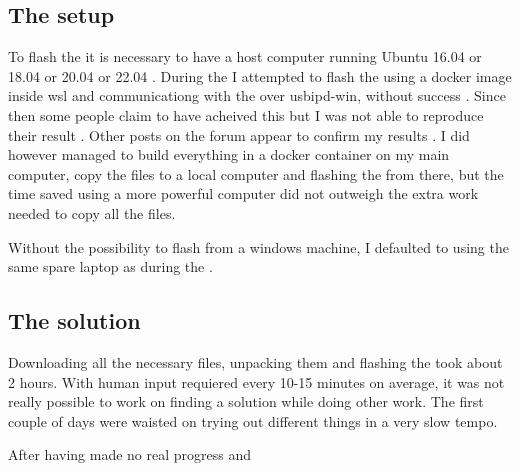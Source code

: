 \subsection{The setup}
To flash the \jx it is necessary to have a host computer running Ubuntu 16.04 or 18.04 or 20.04 or 22.04 \cite{nvidiaSDKManager2019}.
During the \preproject I attempted to flash the \jx using a docker image inside \gls{wsl} and communicationg with the \jx over usbipd-win, without success \cite{martensPortableSensorRig2022} \cite{nvidiaSDKManager2019} \cite{dorsselaerUsbipdwin2023}.
Since then some people claim to have acheived this but I was not able to reproduce their result \jx \cite{makinbacon21TUTORIALUsingSdkmanager2022}.
Other posts on the forum appear to confirm my results \cite{2008PleaseProvideMore2022}.
I did however managed to build everything in a docker container on my main computer, copy the files to a local computer and flashing the \jx from there,
but the time saved using a more powerful computer did not outweigh the extra work needed to copy all the files.

Without the possibility to flash from a windows machine, I defaulted to using the same spare laptop as during the \preproject \cite{martensPortableSensorRig2022}.


\subsection{The solution}
Downloading all the necessary files, unpacking them and flashing the \jx took about 2 hours.
With human input requiered every 10-15 minutes on average, it was not really possible to work on finding a solution while doing other work.
The first couple of days were waisted on trying out different things in a very slow tempo.

After having made no real progress and













